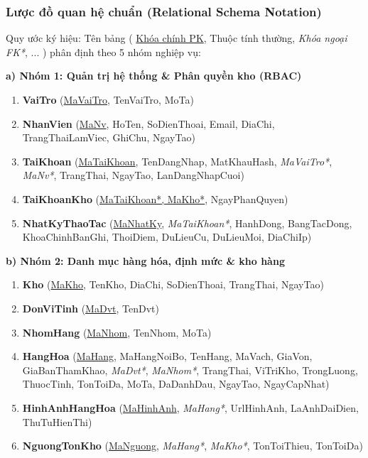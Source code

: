 \documentclass[12pt,a4paper]{report}
\renewcommand{\_}{\textunderscore\allowbreak}
\begin{document}
\subsubsection{Lược đồ quan hệ chuẩn (Relational Schema Notation)}
Quy ước ký hiệu: Tên bảng ( \underline{Khóa chính PK}, Thuộc tính thường, \textit{Khóa ngoại FK*}, ... ) phân định theo 5 nhóm nghiệp vụ:

\begin{sloppypar}
\textbf{a) Nhóm 1: Quản trị hệ thống \& Phân quyền kho (RBAC)}
\begin{enumerate}[leftmargin=*, label={\textbf{\arabic*./}}]
    \item \textbf{VaiTro} (\underline{MaVaiTro}, TenVaiTro, MoTa)
    \item \textbf{NhanVien} (\underline{MaNv}, HoTen, SoDienThoai, Email, DiaChi, TrangThaiLamViec, GhiChu, NgayTao)
    \item \textbf{TaiKhoan} (\underline{MaTaiKhoan}, TenDangNhap, MatKhauHash, \textit{MaVaiTro*}, \textit{MaNv*}, TrangThai, NgayTao, LanDangNhapCuoi)
    \item \textbf{TaiKhoan\_Kho} (\underline{MaTaiKhoan*, MaKho*}, NgayPhanQuyen)
    \item \textbf{NhatKyThaoTac} (\underline{MaNhatKy}, \textit{MaTaiKhoan*}, HanhDong, BangTacDong, KhoaChinhBanGhi, ThoiDiem, DuLieuCu, DuLieuMoi, DiaChiIp)
\end{enumerate}

\textbf{b) Nhóm 2: Danh mục hàng hóa, định mức \& kho hàng}
\begin{enumerate}[leftmargin=*, resume, label={\textbf{\arabic*./}}]
    \item \textbf{Kho} (\underline{MaKho}, TenKho, DiaChi, SoDienThoai, TrangThai, NgayTao)
    \item \textbf{DonViTinh} (\underline{MaDvt}, TenDvt)
    \item \textbf{NhomHang} (\underline{MaNhom}, TenNhom, MoTa)
    \item \textbf{HangHoa} (\underline{MaHang}, MaHangNoiBo, TenHang, MaVach, GiaVon, GiaBanThamKhao, \textit{MaDvt*}, \textit{MaNhom*}, TrangThai, ViTriKho, TrongLuong, ThuocTinh, TonToiDa, MoTa, DaDanhDau, NgayTao, NgayCapNhat)
    \item \textbf{HinhAnhHangHoa} (\underline{MaHinhAnh}, \textit{MaHang*}, UrlHinhAnh, LaAnhDaiDien, ThuTuHienThi)
    \item \textbf{NguongTonKho} (\underline{MaNguong}, \textit{MaHang*}, \textit{MaKho*}, TonToiThieu, TonToiDa)
\end{enumerate}


\end{sloppypar}
\end{document}
